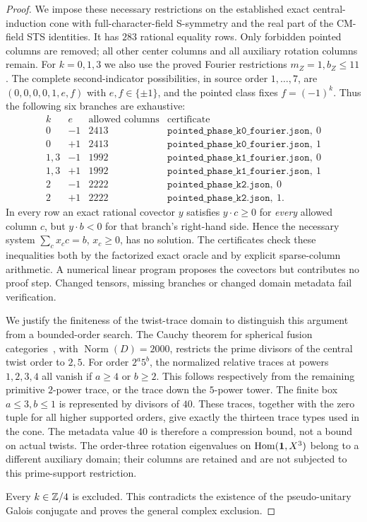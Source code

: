 \begin{proof}
We impose these necessary restrictions on the established exact
central-induction cone with full-character-field S-symmetry and
the real part of the CM-field STS identities.  It has $283$ rational
equality rows.  Only forbidden pointed columns are removed; all
other center columns and all auxiliary rotation columns remain.
For $k=0,1,3$ we also use the proved Fourier restrictions
$m_Z=1,b_Z\leq11$.  The complete second-indicator possibilities,
in source order $1,\ldots,7$, are
$(0,0,0,0,1,e,f)$ with $e,f\in\{\pm1\}$, and the pointed class
fixes $f=(-1)^k$.  Thus the following six branches are exhaustive:
\[
\begin{array}{c|r|r|l}
k&e&\text{allowed columns}&\text{certificate}\\\hline
0&-1&2413&\texttt{pointed\_phase\_k0\_fourier.json},\ 0\\
0&+1&2413&\texttt{pointed\_phase\_k0\_fourier.json},\ 1\\
1,3&-1&1992&\texttt{pointed\_phase\_k1\_fourier.json},\ 0\\
1,3&+1&1992&\texttt{pointed\_phase\_k1\_fourier.json},\ 1\\
2&-1&2222&\texttt{pointed\_phase\_k2.json},\ 0\\
2&+1&2222&\texttt{pointed\_phase\_k2.json},\ 1.
\end{array}
\]
In every row an exact rational covector $y$ satisfies
$y\cdot c\geq0$ for \emph{every} allowed column $c$, but
$y\cdot b<0$ for that branch's right-hand side.  Hence the
necessary system $\sum_c x_cc=b$, $x_c\geq0$, has no solution.
The certificates check these inequalities both by the factorized
exact oracle and by explicit sparse-column arithmetic.  A numerical
linear program proposes the covectors but contributes no proof
step.  Changed tensors, missing branches or changed domain metadata
fail verification.

We justify the finiteness of the twist-trace domain to distinguish
this argument from a bounded-order search.  The Cauchy theorem for
spherical fusion categories~\cite{BNRWCauchy}, with
$\operatorname{Norm}(D)=2000$, restricts the prime divisors of the
central twist order to $2,5$.  For order $2^a5^b$, the normalized
relative traces at powers $1,2,3,4$ all vanish if $a\geq4$ or
$b\geq2$.  This follows respectively from the remaining primitive
$2$-power trace, or the trace down the $5$-power tower.  The finite
box $a\leq3,b\leq1$ is represented by divisors of $40$.
These traces, together with the zero tuple for all higher supported
orders, give exactly the thirteen trace types used in the cone.
The metadata value $40$ is therefore a compression bound, not a
bound on actual twists.  The order-three rotation eigenvalues on
$\operatorname{Hom}(\mathbf1,X^3)$ belong to a different auxiliary
domain; their columns are retained and are not subjected to this
prime-support restriction.

Every $k\in\mathbb Z/4$ is excluded.  This contradicts the existence of
the pseudo-unitary Galois conjugate and proves the general complex
exclusion.
\end{proof}

